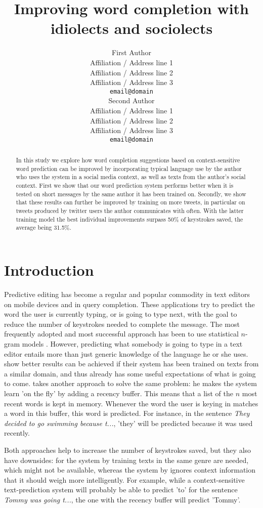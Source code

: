 \documentclass[11pt]{article}
\title{Improving word completion with idiolects and sociolects}
\author{First Author \\
  Affiliation / Address line 1 \\
  Affiliation / Address line 2 \\
  Affiliation / Address line 3 \\
  {\tt email@domain} \\\And
  Second Author \\
  Affiliation / Address line 1 \\
  Affiliation / Address line 2 \\
  Affiliation / Address line 3 \\
  {\tt email@domain} \\}
\date{}
\begin{document}
\maketitle

\begin{abstract} 
In this study we explore how word completion suggestions based on context-sensitive word prediction can be improved by incorporating typical language use by the author who uses the system in a social media context, as well as texts from the author's social context. First we show that our word prediction system performs better when it is tested on short messages by the same author it has been trained on. Secondly, we show that these results can further be improved by training on more tweets, in particular on tweets produced by twitter users the author communicates with often. With the latter training model the best individual improvements surpass 50\% of keystrokes saved, the average being 31.5\%.


\end{abstract}

\section{Introduction}
Predictive editing has become a regular and popular commodity in text editors on mobile devices and in query completion. These applications try to predict the word the user is currently typing, or is going to type next, with the goal to reduce the number of keystrokes needed to complete the message. The most frequently adopted and most successful approach has been to use statistical $n$-gram models \cite{Lesher+99,Nantais+01,Matiasek+02,Fazly+03,How+05,Tanaka-Ishii07}. However, predicting what somebody is going to type in a text editor entails more than just generic knowledge of the language he or she uses.  show better results can be achieved if their system has been trained on texts from a similar domain, and thus already has some useful expectations of what is going to come.  takes another approach to solve the same problem: he makes the system learn 'on the fly' by adding a recency buffer. This means that a list of the $n$ most recent words is kept in memory. Whenever the word the user is keying in matches a word in this buffer, this word is predicted. For instance, in the sentence \emph{They decided to go swimming because t...}, 'they' will be predicted because it was used recently.

Both approaches help to increase the number of keystrokes saved, but they also have downsides: for the system by  training texts in the same genre are needed, which might not be available, whereas the system by  ignores context information that it should weigh more intelligently. For example, while a context-sensitive text-prediction system will probably be able to predict 'to' for the sentence \emph{Tommy was going t...}, the one with the recency buffer will predict 'Tommy'.
\end{document}
